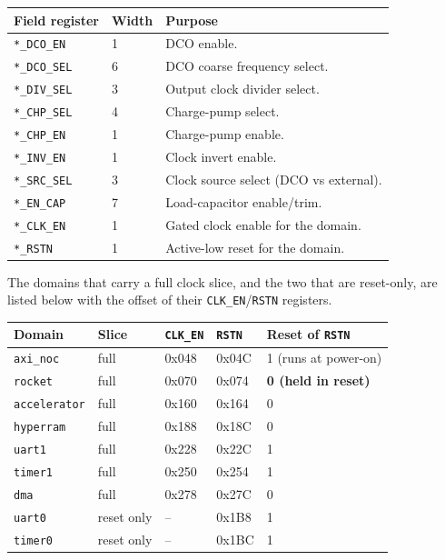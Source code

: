 \begin{tabular}{@{}lll@{}}
\toprule
\textbf{Field register} & \textbf{Width} & \textbf{Purpose} \\
\midrule
\texttt{*\_DCO\_EN}  & 1 & DCO enable. \\
\texttt{*\_DCO\_SEL} & 6 & DCO coarse frequency select. \\
\texttt{*\_DIV\_SEL} & 3 & Output clock divider select. \\
\texttt{*\_CHP\_SEL} & 4 & Charge-pump select. \\
\texttt{*\_CHP\_EN}  & 1 & Charge-pump enable. \\
\texttt{*\_INV\_EN}  & 1 & Clock invert enable. \\
\texttt{*\_SRC\_SEL} & 3 & Clock source select (DCO vs external). \\
\texttt{*\_EN\_CAP}  & 7 & Load-capacitor enable/trim. \\
\texttt{*\_CLK\_EN}  & 1 & Gated clock enable for the domain. \\
\texttt{*\_RSTN}     & 1 & Active-low reset for the domain. \\
\bottomrule
\end{tabular}

The domains that carry a full clock slice, and the two that are reset-only, are listed below with the
offset of their \texttt{CLK\_EN}/\texttt{RSTN} registers.

\begin{longtable}{@{}lllll@{}}
\toprule
\textbf{Domain} & \textbf{Slice} & \texttt{CLK\_EN} & \texttt{RSTN} & \textbf{Reset of \texttt{RSTN}} \\
\midrule
\endhead
\texttt{axi\_noc}     & full & 0x048 & 0x04C & 1 (runs at power-on) \\
\texttt{rocket}       & full & 0x070 & 0x074 & \textbf{0 (held in reset)} \\
\texttt{accelerator}  & full & 0x160 & 0x164 & 0 \\
\texttt{hyperram}     & full & 0x188 & 0x18C & 0 \\
\texttt{uart1}        & full & 0x228 & 0x22C & 1 \\
\texttt{timer1}       & full & 0x250 & 0x254 & 1 \\
\texttt{dma}          & full & 0x278 & 0x27C & 0 \\
\texttt{uart0}        & reset only & -- & 0x1B8 & 1 \\
\texttt{timer0}       & reset only & -- & 0x1BC & 1 \\
\bottomrule
\end{longtable}

